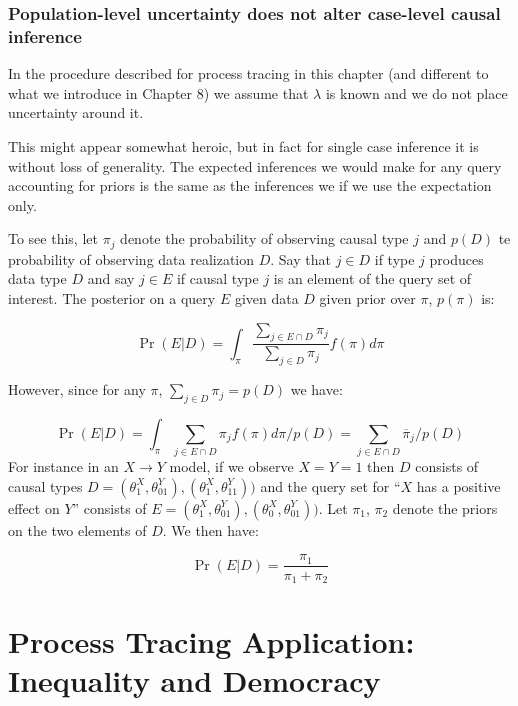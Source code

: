 \documentclass[
  12pt,
]{book}
\begin{document}
\hypertarget{population-level-uncertainty-does-not-alter-case-level-causal-inference}{%
\subsection{Population-level uncertainty does not alter case-level causal inference}\label{population-level-uncertainty-does-not-alter-case-level-causal-inference}}

In the procedure described for process tracing in this chapter (and different to what we introduce in Chapter 8) we assume that \(\lambda\) is known and we do not place uncertainty around it.

This might appear somewhat heroic, but in fact for single case inference it is without loss of generality. The expected inferences we would make for any query accounting for priors is the same as the inferences we if we use the expectation only.

To see this, let \(\pi_j\) denote the probability of observing causal type \(j\) and \(p(D)\) te probability of observing data realization \(D\). Say that \(j \in D\) if type \(j\) produces data type \(D\) and say \(j \in E\) if causal type \(j\) is an element of the query set of interest.
The posterior on a query \(E\) given data \(D\) given prior over \(\pi\), \(p(\pi)\) is:

\[\Pr(E | D) = \int_\pi  \frac{\sum_{j \in E \cap D}\pi_j}{\sum_{j \in D}\pi_j} f(\pi)d\pi\]

However, since for any \(\pi\), \(\sum_{j \in D}\pi_j = p(D)\) we have:

\[\Pr(E | D) = \int_\pi  \sum_{j \in E \cap D}\pi_j f(\pi)d\pi/p(D) = \sum_{j \in  E \cap D} \overline{\pi}_j/p(D)\]
For instance in an \(X \rightarrow Y\) model, if we observe \(X=Y=1\) then \(D\) consists of causal types \(D={(\theta^X_1, \theta^Y_{01}), (\theta^X_1, \theta^Y_{11})})\) and the query set for ``\(X\) has a positive effect on \(Y\)'' consists of \(E={(\theta^X_1, \theta^Y_{01}), (\theta^X_0, \theta^Y_{01})})\). Let \(\pi_1\), \(\pi_2\) denote the priors on the two elements of \(D\). We then have:

\[\Pr(E | D) =  \frac{\pi_1}{\pi_1 + \pi_2}\]

\hypertarget{ptapp}{%
\chapter{Process Tracing Application: Inequality and Democracy}\label{ptapp}}
\end{document}
